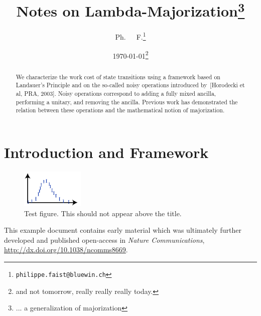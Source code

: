 \documentclass[11pt,a4paper]{article}
\title{Notes on Lambda-Majorization\thanks[9]{... a generalization of majorization}%
%
}
\author{Ph.\thanksmark[9]~~~F.\thanks{\texttt{philippe{.}faist{@}{}b{}l{}u{}e{}win.ch}}}
\date{\today\thanks{and not tomorrow, really really really today.}}
\newif\iftestnoteNeedsMinPkgs\testnoteNeedsMinPkgsfalse
\theoremstyle{plain}
\begin{document}
\maketitle

\begin{abstract}
  We characterize the work cost of state transitions using a framework based on Landauer's
  Principle and on the so-called noisy operations introduced by~[Horodecki et al, PRA,
  2003]. Noisy operations correspond to adding a fully mixed ancilla, performing a
  unitary, and removing the ancilla. Previous work has demonstrated the relation between
  these operations and the mathematical notion of majorization.

  \iftestnoteNeedsMinPkgs ([NeedsMinPkgs=TRUE])\fi
\end{abstract}


\inlinetoc

\section{Introduction and Framework}

\begin{figure}[t]
  \centering
  \includegraphics[width=3cm]{testfigure}
  \caption{Test figure. This should not appear above the title.}
  \label{fig:test}
\end{figure}

This example document contains early material which was ultimately further developed and
published open-access in \emph{Nature Communications},
\url{http://dx.doi.org/10.1038/ncomms8669}.
\end{document}
